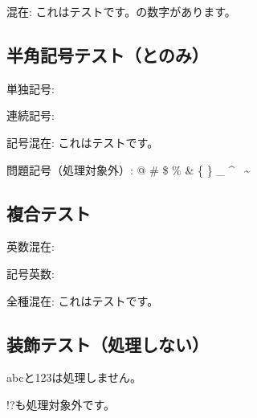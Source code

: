 混在:
これはテストです。{\small{}}の数字{\small{}}があります。

\hypertarget{ux534aux89d2ux8a18ux53f7ux30c6ux30b9ux30c8ux3068ux306eux307f}{%
\subsection{\texorpdfstring{半角記号テスト（\tatechuyoko*{!}とのみ）}{半角記号テスト（とのみ）}}\label{ux534aux89d2ux8a18ux53f7ux30c6ux30b9ux30c8ux3068ux306eux307f}}

単独記号: \tatechuyoko*{!} 

連続記号: {\small\tatechuyoko*{!!}}
{\small{}} {\small{}}
{\small{}}

記号混在: これは\tatechuyoko*{!}テストです。

問題記号（処理対象外）:
@ \# \$ \% \& \{ \} \_ \^{} ~\textasciitilde{} \textbar{}

\hypertarget{ux8907ux5408ux30c6ux30b9ux30c8}{%
\subsection{複合テスト}\label{ux8907ux5408ux30c6ux30b9ux30c8}}

英数混在: 
 

記号英数: \tatechuyoko*{!}

全種混在:
これは\tatechuyoko*{!}テストです。

\hypertarget{htmlux88c5ux98feux30c6ux30b9ux30c8ux51e6ux7406ux3057ux306aux3044}{%
\subsection{\texorpdfstring{装飾テスト（処理しない）}{装飾テスト（処理しない）}}\label{htmlux88c5ux98feux30c6ux30b9ux30c8ux51e6ux7406ux3057ux306aux3044}}

{abc}と{123}は処理しません。

{!?}も処理対象外です。
